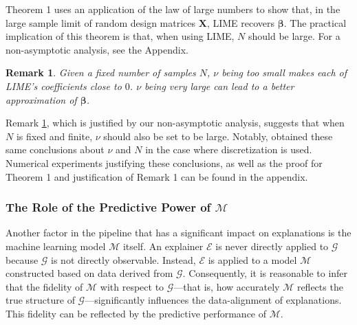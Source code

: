 \documentclass[mnsc,blindrev]{informs3}
\newcommand{\mM}{\mathcal{M}}
\newtheorem{remark2}[thm]{Remark}
\begin{document}
             Theorem 1 uses an application of the law of large numbers to show that, in the large sample limit of random design matrices $\mathbf{X}$, LIME recovers $\boldsymbol{\beta}$. The practical implication of this theorem is that, when using LIME, $N$ should be large.  For a non-asymptotic analysis, see the Appendix. %

            \begin{remark2}
                \label{nu_remark}
                Given a fixed number of samples $N$, $\nu$ being too small makes each of LIME's coefficients close to $0$. $\nu$ being very large can lead to a better approximation of $\boldsymbol{\beta}$. 
            \end{remark2}

            Remark \ref{nu_remark}, which is justified by our non-asymptotic analysis, suggests that when $N$ is fixed and finite, $\nu$  should also be set to be large. Notably, \citep{garreau20theoretical} obtained these same conclusions about $\nu$ and $N$ in the case where discretization is used. Numerical experiments justifying these conclusions, as well as the proof for Theorem 1 and justification of Remark 1 can be found in the appendix. 
    \subsubsection{The Role of the Predictive Power of $\mathcal{M}$}
        \label{sec:role_of_predictive_power}
           Another factor in the pipeline that has a significant impact on  explanations is the machine learning model $\mathcal{M}$ itself. 
      An explainer $\mathcal{E}$ is never directly applied to $\mathcal{G}$ because  $\mathcal{G}$ is not directly observable. Instead, $\mathcal{E}$ is applied to a model $\mathcal{M}$ constructed based on data derived from $\mathcal{G}$. Consequently, it is reasonable to infer that the fidelity of $\mathcal{M}$ with respect to $\mathcal{G}$—that is, how accurately $\mathcal{M}$ reflects the true structure of $\mathcal{G}$—significantly influences the data-alignment of explanations. This fidelity can be reflected by the predictive performance of $\mM$.  
\end{document}
